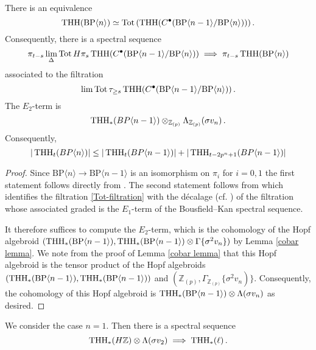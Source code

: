 \begin{proposition}\label{induction spectral sequence}
There is an equivalence 
\[ 
	\operatorname{THH}(\mathrm{BP}\langle n \rangle)\simeq \operatorname*{Tot} \left ( \operatorname{THH}(C^{\bullet}(\mathrm{BP}\langle n-1\rangle/\mathrm{BP}\langle n\rangle)) \right ).
\]
Consequently, there is a spectral sequence 
\[ 
	\pi_{t-s}\lim_{\Delta} \operatorname*{Tot} H\pi_s\operatorname{THH}(C^{\bullet}(\mathrm{BP}\langle n-1\rangle/\mathrm{BP}\langle n\rangle))\implies \pi_{t-s}\operatorname{THH}(\mathrm{BP}\langle n\rangle)
\]
associated to the filtration 
\begin{equation}\label{Tot-filtration}
	\lim \operatorname*{Tot} \tau_{\ge s}\operatorname{THH}(C^{\bullet}(\mathrm{BP}\langle n-1\rangle/\mathrm{BP}\langle n\rangle))\,.
\end{equation}
The $E_2$-term is
\[ \operatorname{THH}_*(BP\langle n-1\rangle)\otimes_{\mathbb{Z}_{(p)}} \Lambda_{\mathbb{Z}_{(p)}} (\sigma v_n) \,.\]
Consequently,
\[ |\operatorname{THH}_{t}(BP\langle n \rangle)|\le |\operatorname{THH}_{t}(BP\langle n-1 \rangle)| + |\operatorname{THH}_{t-2p^{n}+1}(BP\langle n-1 \rangle)|\]
\end{proposition}
\begin{proof}
Since $\mathrm{BP}\langle n\rangle\to \mathrm{BP}\langle n-1\rangle$ is an isomorphism on $\pi_i$ for $i=0,1$ the first statement follows directly from \cite[Theorem 3.7]{DR18}. 
The second statement follows from \cite[Remark 3.7]{GIKR22} which identifies the filtration \eqref{Tot-filtration} with the d\'ecalage (cf. \cite[pp. 21]{Del71}) of the filtration whose associated graded is the $E_{1}$-term of the Bousfield--Kan spectral sequence. 

It therefore suffices to compute the $E_{2}$-term, which is the cohomology of the Hopf algebroid $(\operatorname{THH}_{*}(\mathrm{BP}\langle n-1\rangle), \operatorname{THH}_{*}(\mathrm{BP}\langle n-1\rangle)\otimes \Gamma \{ \sigma^{2}v_{n} \} )$ by Lemma \ref{cobar lemma}. 
We note from the proof of Lemma \ref{cobar lemma} that this Hopf algebroid is the tensor product of the Hopf algebroids 
$(\operatorname{THH}_{*}(\mathrm{BP}\langle n-1\rangle), \operatorname{THH}_{*}(\mathrm{BP}\langle n-1\rangle))$ and $(\mathbb{Z}_{(p)},\Gamma_{\mathbb{Z}_{(p)}} \{ \sigma^{2}v_{n})\} $. 
Consequently, the cohomology of this Hopf algebroid is $\operatorname{THH}_{*}(\mathrm{BP}\langle n-1\rangle )\otimes \Lambda (\sigma v_{n})$ as desired. 
\end{proof}

\begin{example}
We consider the case $n=1$. Then there is a spectral sequence 
\[ \operatorname{THH}_{*}(H\mathbb{Z})\otimes \Lambda (\sigma v_{2})\implies \operatorname{THH}_{*}(\ell) \,.\]


\end{example}


